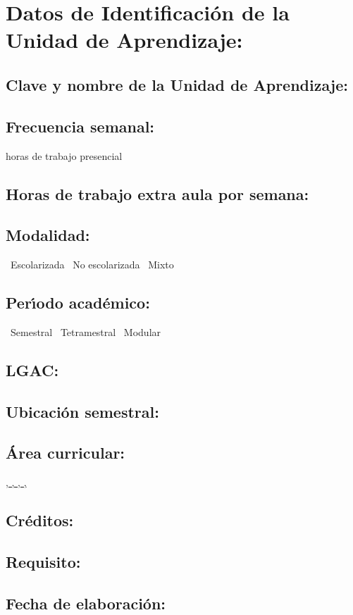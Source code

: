 \documentclass[10 pt]{article}
\begin{document}


\section{Datos de Identificaci\'{o}n de la Unidad de Aprendizaje:}
\subsection{Clave y nombre de la Unidad de Aprendizaje:} 
\subsection{Frecuencia semanal:} horas de trabajo presencial 
\subsection{Horas de trabajo extra aula por semana:} 
\subsection{Modalidad:} \yes~Escolarizada \no~No escolarizada \no~Mixto
\subsection{Per\'{\i}odo acad\'{e}mico:} \yes~Semestral
\no~Tetramestral \no~Modular
\subsection{LGAC:} \underline{\seys}
\subsection{Ubicaci\'{o}n semestral:} 
\subsection{\'{A}rea curricular:} \underline{\fb, \fa, \da, \le, \inv}
\subsection{Cr\'{e}ditos:} 
\subsection{Requisito:} 
\subsection{Fecha de elaboraci\'{o}n:} 
\end{document}
